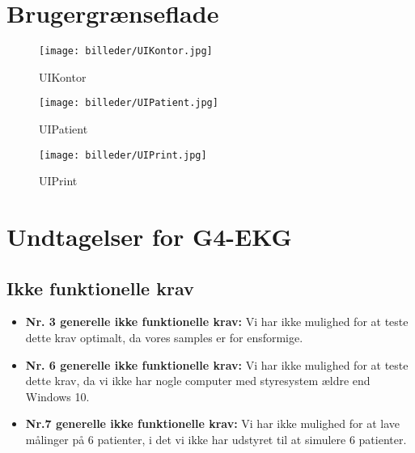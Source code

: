 \section{Brugergrænseflade}
\begin{figure}[H]
\centering
\texttt{[image: billeder/UIKontor.jpg]}
\caption{UIKontor}
\label{fig:UIKontor}
\end{figure}

\begin{figure}[H]
\centering
\texttt{[image: billeder/UIPatient.jpg]}
\caption{UIPatient}
\label{fig:UIPatient}
\end{figure}

\begin{figure}[H]
\centering
\texttt{[image: billeder/UIPrint.jpg]}
\caption{UIPrint}
\label{fig:UIPrint}
\end{figure}



\newpage

\section{Undtagelser for G4-EKG}
\subsection{Ikke funktionelle krav}
\begin{itemize}[label=$\circ$]
\item \textbf{Nr. 3 generelle ikke funktionelle krav:} Vi har ikke mulighed for at teste dette krav optimalt, da vores samples er for ensformige. 
\item \textbf{Nr. 6 generelle ikke funktionelle krav:} Vi har ikke mulighed for at teste dette krav, da vi ikke har nogle computer med styresystem ældre end Windows 10.
\item \textbf{Nr.7 generelle ikke funktionelle krav:} Vi har ikke mulighed for at lave målinger på 6 patienter, i det vi ikke har udstyret til at simulere 6 patienter. 

\end{itemize}
